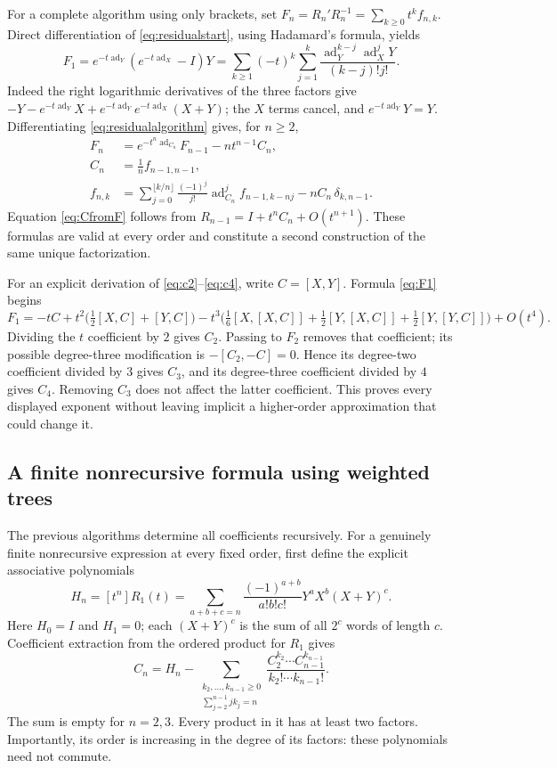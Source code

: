 \documentclass[11pt]{article}
\numberwithin{equation}{section}
\theoremstyle{definition}
\theoremstyle{remark}
\DeclareMathOperator{\ad}{ad}
\begin{document}
For a complete algorithm using only brackets, set
$F_n=R_n'R_n^{-1}=\sum_{k\geq0}t^k f_{n,k}$.
Direct differentiation of \eqref{eq:residualstart}, using Hadamard's
formula, yields
\begin{equation}\label{eq:F1}
 F_1=e^{-t\ad_Y}(e^{-t\ad_X}-I)Y
 =\sum_{k\geq1}(-t)^k
   \sum_{j=1}^{k}\frac{\ad_Y^{k-j}\ad_X^jY}{(k-j)!j!}.
\end{equation}
Indeed the right logarithmic derivatives of the three factors give
$-Y-e^{-t\ad_Y}X+e^{-t\ad_Y}e^{-t\ad_X}(X+Y)$;
the $X$ terms cancel, and $e^{-t\ad_Y}Y=Y$.
Differentiating \eqref{eq:residualalgorithm} gives, for $n\geq2$,
\begin{align}
 F_n&=e^{-t^n\ad_{C_n}}F_{n-1}-nt^{n-1}C_n,
       \label{eq:Fn}\\
 C_n&=\frac1n f_{n-1,n-1},\label{eq:CfromF}\\
 f_{n,k}&=\sum_{j=0}^{\lfloor k/n\rfloor}
       \frac{(-1)^j}{j!}\ad_{C_n}^j f_{n-1,k-nj}
       -n C_n\,\delta_{k,n-1}.\label{eq:Fcoeff}
\end{align}
Equation \eqref{eq:CfromF} follows from
$R_{n-1}=I+t^nC_n+O(t^{n+1})$. These formulas are valid at every
order and constitute a second construction of the same unique
factorization.

For an explicit derivation of \eqref{eq:c2}--\eqref{eq:c4}, write
$C=[X,Y]$. Formula \eqref{eq:F1} begins
\[
 F_1=-tC+t^2\bigl(\tfrac12[X,C]+[Y,C]\bigr)
 -t^3\bigl(\tfrac16[X,[X,C]]
            +\tfrac12[Y,[X,C]]+\tfrac12[Y,[Y,C]]\bigr)
 +O(t^4).
\]
Dividing the $t$ coefficient by $2$ gives $C_2$. Passing to $F_2$
removes that coefficient; its possible degree-three modification is
$-[C_2,-C]=0$. Hence its degree-two coefficient divided by $3$
gives $C_3$, and its degree-three coefficient divided by $4$ gives
$C_4$. Removing $C_3$ does not affect the latter coefficient.
This proves every displayed exponent without leaving implicit a
higher-order approximation that could change it.

\subsection{A finite nonrecursive formula using weighted trees}
The previous algorithms determine all coefficients recursively.
For a genuinely finite nonrecursive expression at every fixed
order, first define the explicit associative polynomials
\begin{equation}\label{eq:Hn}
 H_n=[t^n]R_1(t)=
 \sum_{a+b+c=n}\frac{(-1)^{a+b}}{a!b!c!}
       Y^aX^b(X+Y)^c.
\end{equation}
Here $H_0=I$ and $H_1=0$; each $(X+Y)^c$ is the sum of all $2^c$
words of length $c$. Coefficient extraction from the ordered product
for $R_1$ gives
\begin{equation}\label{eq:forwardC}
 C_n=H_n-
 \sum_{\substack{k_2,\ldots,k_{n-1}\geq0\\
                 \sum_{j=2}^{n-1}jk_j=n}}
 \frac{C_2^{k_2}\cdots C_{n-1}^{k_{n-1}}}
      {k_2!\cdots k_{n-1}!}.
\end{equation}
The sum is empty for $n=2,3$. Every product in it has at least two
factors. Importantly, its order is increasing in the degree of its
factors: these polynomials need not commute.
\end{document}
